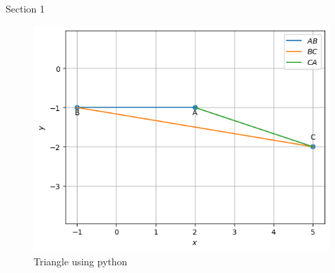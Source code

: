 \begin{table}[H]
    \centering
    
    \caption{Section 1}
    \label{tab:Section1}
\end{table}
\begin{figure}[H]
\includegraphics[width=\columnwidth]{section1/figs/section1.png}
\caption{Triangle using python}
\label{fig:triangle_plot}
\end{figure}